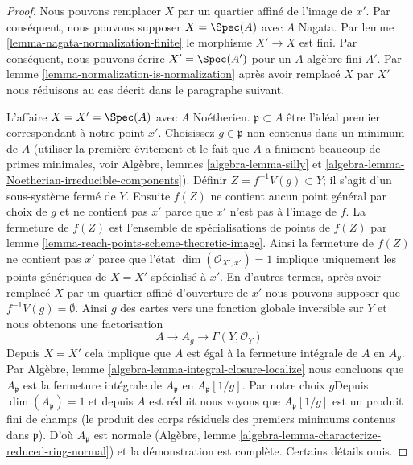 \begin{proof}
Nous pouvons remplacer $X$ par un quartier affiné de l'image de $x'$. Par conséquent, nous pouvons supposer $X = \Spec(A)$ avec $A$ Nagata. Par lemme \ref{lemma-nagata-normalization-finite} le morphisme $X' \to X$ est fini. Par conséquent, nous pouvons écrire $X' = \Spec(A')$ pour un $A$-algèbre fini $A'$. Par lemme \ref{lemma-normalization-is-normalization} après avoir remplacé $X$ par $X'$ nous réduisons au cas décrit dans le paragraphe suivant.

\medskip\noindent

L'affaire $X = X' = \Spec(A)$ avec $A$ Noétherien. $\mathfrak p \subset A$ être l'idéal premier correspondant à notre point $x'$. Choisissez $g \in \mathfrak p$
non contenus dans un minimum de $A$ (utiliser la première évitement et le fait que $A$ a finiment beaucoup de primes minimales, voir Algèbre, lemmes \ref{algebra-lemma-silly} et
\ref{algebra-lemma-Noetherian-irreducible-components}). Définir $Z = f^{-1}V(g) \subset Y$; il s'agit d'un sous-système fermé de $Y$. Ensuite $f(Z)$ ne contient aucun point général par choix de $g$
et ne contient pas $x'$ parce que $x'$ n'est pas à l'image de $f$. La fermeture de $f(Z)$ est l'ensemble de spécialisations de points de $f(Z)$ par lemme \ref{lemma-reach-points-scheme-theoretic-image}. Ainsi la fermeture de $f(Z)$ ne contient pas $x'$ parce que l'état $\dim(\mathcal{O}_{X', x'}) = 1$ implique uniquement les points génériques de $X = X'$ spécialisé à $x'$. En d'autres termes, après avoir remplacé $X$ par un quartier affiné d'ouverture de $x'$ nous pouvons supposer que $f^{-1}V(g) = \emptyset$. Ainsi $g$ des cartes vers une fonction globale inversible sur $Y$ et nous obtenons une factorisation
$$
A \to A_g \to \Gamma(Y, \mathcal{O}_Y)
$$
Depuis $X = X'$ cela implique que $A$ est égal à la fermeture intégrale de $A$ en $A_g$. Par Algèbre, lemme \ref{algebra-lemma-integral-closure-localize}
nous concluons que $A_\mathfrak p$ est la fermeture intégrale de $A_\mathfrak p$ en $A_\mathfrak p[1/g]$. Par notre choix $g$Depuis $\dim(A_\mathfrak p) = 1$
et depuis $A$ est réduit nous voyons que $A_\mathfrak p[1/g]$
est un produit fini de champs (le produit des corps résiduels des premiers minimums contenus dans $\mathfrak p$). D'où $A_\mathfrak p$ est normale (Algèbre, lemme \ref{algebra-lemma-characterize-reduced-ring-normal}) et la démonstration est complète. Certains détails omis.

\end{proof}






